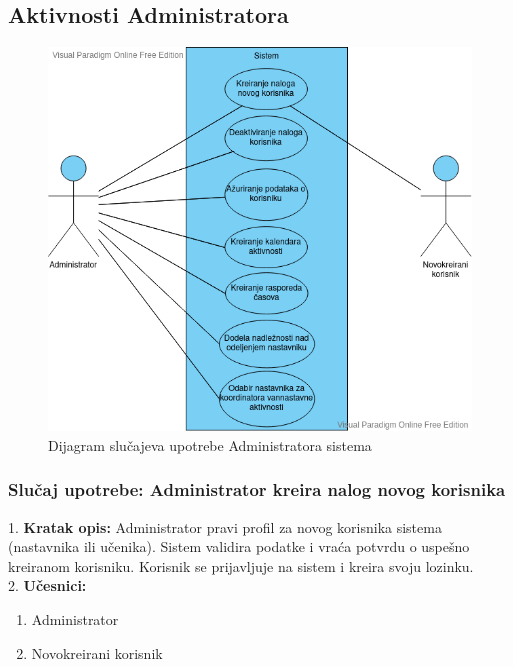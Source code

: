 \documentclass{article}
\begin{document}
\newpage
\subsection{Aktivnosti Administratora}

\begin{figure} [!ht]
    \begin{center}
        \includegraphics[scale=0.6]{imgs/admin_use_case.png}
    \end{center}
\caption{Dijagram slučajeva upotrebe Administratora sistema}
\end{figure}


\newpage
\subsubsection{Slučaj upotrebe: Administrator kreira nalog novog korisnika} 
1. \textbf{Kratak opis:} Administrator pravi profil za novog korisnika sistema (nastavnika ili učenika). Sistem validira podatke i vraća potvrdu o uspešno kreiranom korisniku. Korisnik se prijavljuje na sistem i kreira svoju lozinku. \\

2. \textbf{Učesnici:}
\begin{enumerate} [label=(\alph*)]
\item Administrator
\item Novokreirani korisnik
\end{enumerate} 
\end{document}
